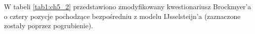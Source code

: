 \newpage

W tabeli \ref{tab1:ch5_2} przedstawiono zmodyfikowany kwestionariusz Brockmyer'a\cite{development_of_game}
o cztery pozycje pochodzące bezpośredniu z modelu IJsselsteijn'a\cite{game_exp_quest}
(zaznaczone zostały poprzez pogrubienie). 